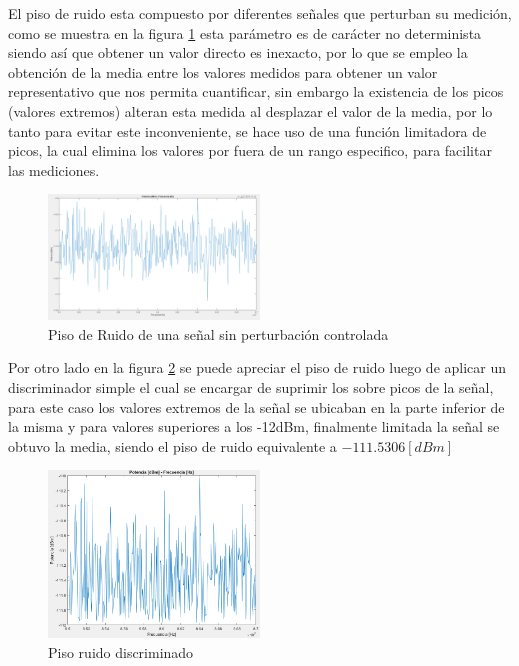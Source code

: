 \documentclass[conference]{IEEEtran}
\begin{document}
	
	El piso de ruido esta compuesto por diferentes señales que perturban su medición, como se muestra en la figura \ref{fig:piso-ruido} esta parámetro es de carácter no determinista siendo así que obtener un valor directo es inexacto, por lo que se empleo la obtención de la media entre los valores medidos para obtener un valor representativo que nos permita cuantificar, sin embargo la existencia de los picos (valores extremos) alteran esta medida al desplazar el valor de la media, por lo tanto para evitar este inconveniente, se hace uso de una función limitadora de picos, la cual elimina los valores por fuera de un rango especifico, para facilitar las mediciones.
	
	\begin{figure}[h]
		\centering
		\includegraphics[width=0.5\textwidth]{media/piso-ruido}
		\caption{Piso de Ruido de una señal sin perturbación controlada}
		\label{fig:piso-ruido}
	\end{figure}
	
	Por otro lado en la figura \ref{fig:piso-ruido-disc} se puede apreciar el piso de ruido luego de aplicar un discriminador simple el cual se encargar de suprimir los sobre picos de la señal, para este caso los valores extremos de la señal se ubicaban en la parte inferior de la misma y para valores superiores a los -12dBm, finalmente limitada la señal se obtuvo la media, siendo el piso de ruido equivalente a $-111.5306 [dBm]$
	
	\begin{figure}[h]
		\centering
		\includegraphics[width=0.5\textwidth]{media/piso-ruido-disc}
		\caption{Piso ruido discriminado}
		\label{fig:piso-ruido-disc}
	\end{figure}
	
\end{document}
